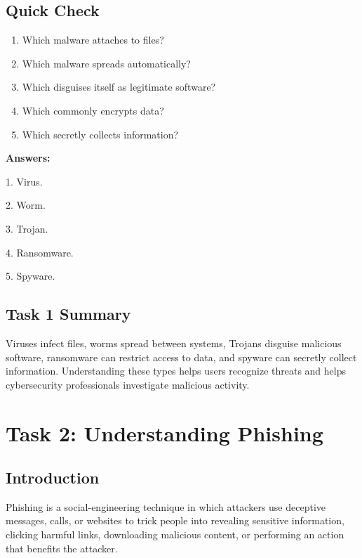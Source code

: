 \documentclass[12pt,a4paper]{article}
\begin{document}
\subsection{Quick Check}

\begin{enumerate}
    \item Which malware attaches to files?
    \item Which malware spreads automatically?
    \item Which disguises itself as legitimate software?
    \item Which commonly encrypts data?
    \item Which secretly collects information?
\end{enumerate}

\textbf{Answers:}

1. Virus.

2. Worm.

3. Trojan.

4. Ransomware.

5. Spyware.


\subsection{Task 1 Summary}

Viruses infect files, worms spread between systems, Trojans disguise malicious software, ransomware can restrict access to data, and spyware can secretly collect information. Understanding these types helps users recognize threats and helps cybersecurity professionals investigate malicious activity.


\clearpage

\section{Task 2: Understanding Phishing}

\subsection{Introduction}

Phishing is a social-engineering technique in which attackers use deceptive messages, calls, or websites to trick people into revealing sensitive information, clicking harmful links, downloading malicious content, or performing an action that benefits the attacker.
\end{document}
